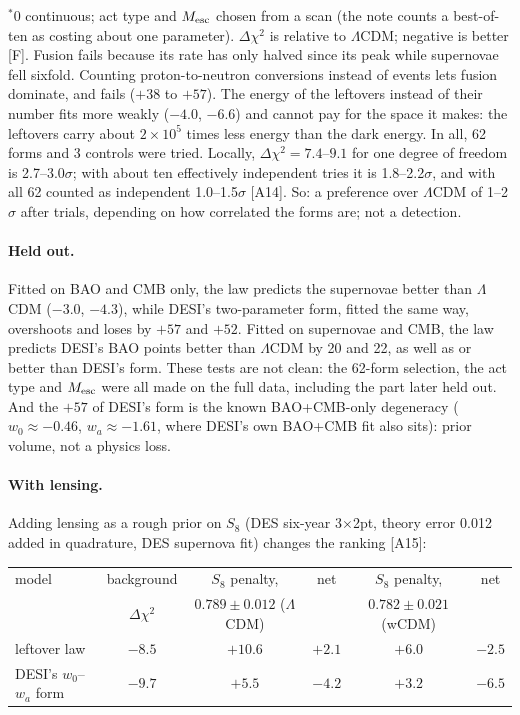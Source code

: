 \documentclass[11pt,a4paper]{article}
\newcommand{\chk}[1]{\textsf{[#1]}}
\begin{document}
\noindent $^\ast$0 continuous; act type and $M_{\rm esc}$ chosen from a scan (the note counts a best-of-ten as costing about one parameter).
$\Delta\chi^2$ is relative to $\Lambda$CDM; negative is better \chk{F}. Fusion fails because its rate has only halved since its peak
while supernovae fell sixfold. Counting proton-to-neutron conversions instead of events lets fusion dominate, and fails ($+38$ to $+57$).
The energy of the leftovers instead of their number fits more weakly ($-4.0$, $-6.6$) and cannot pay for the space it makes: the leftovers
carry about $2\times10^5$ times less energy than the dark energy. In all, 62 forms and 3 controls were tried. Locally, $\Delta\chi^2=7.4$--$9.1$ for one degree of freedom is 2.7--3.0$\sigma$; with about
ten effectively independent tries it is 1.8--2.2$\sigma$, and with all 62 counted as independent 1.0--1.5$\sigma$ \chk{A14}. So: a preference
over $\Lambda$CDM of 1--2$\sigma$ after trials, depending on how correlated the forms are; not a detection.

\paragraph{Held out.} Fitted on BAO and CMB only, the law predicts the supernovae better than $\Lambda$CDM ($-3.0$, $-4.3$), while DESI's
two-parameter form, fitted the same way, overshoots and loses by $+57$ and $+52$. Fitted on supernovae and CMB, the law predicts DESI's BAO
points better than $\Lambda$CDM by 20 and 22, as well as or better than DESI's form. These tests are not clean: the 62-form selection, the
act type and $M_{\rm esc}$ were all made on the full data, including the part later held out. And the $+57$ of DESI's form is the known
BAO+CMB-only degeneracy ($w_0\approx-0.46$, $w_a\approx-1.61$, where DESI's own BAO+CMB fit also sits): prior volume, not a physics loss.

\paragraph{With lensing.} Adding lensing as a rough prior on $S_8$ (DES six-year 3$\times$2pt, theory error 0.012 added in quadrature, DES
supernova fit) changes the ranking \chk{A15}:

\begin{center}\small
\begin{tabular}{@{}lccccc@{}}
\toprule
model & background & $S_8$ penalty, & net & $S_8$ penalty, & net \\
 & $\Delta\chi^2$ & $0.789\pm0.012$ ($\Lambda$CDM) & & $0.782\pm0.021$ (wCDM) & \\
\midrule
leftover law & $-8.5$ & $+10.6$ & $+2.1$ & $+6.0$ & $-2.5$ \\
DESI's $w_0$--$w_a$ form & $-9.7$ & $+5.5$ & $-4.2$ & $+3.2$ & $-6.5$ \\
\bottomrule
\end{tabular}
\end{center}
\end{document}
